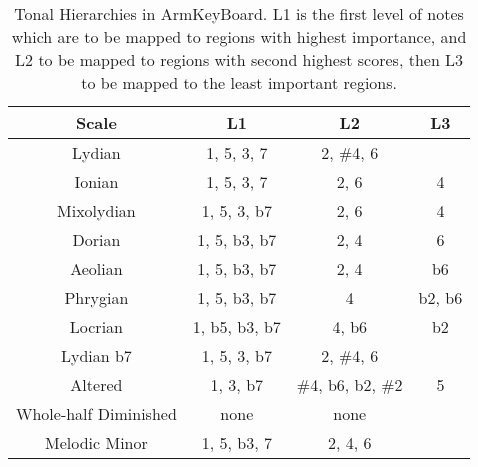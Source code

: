 \begin{table}
\centering
\caption{Tonal Hierarchies in ArmKeyBoard. L1 is the first level of notes which are to be mapped to regions with highest importance, and L2 to be mapped to regions with second highest scores, then L3 to be mapped to the least important regions.}
\begin{tabular}{|c|c|c|c|} \hline
Scale & L1 & L2 & L3\\ \hline
Lydian & 1, 5, 3, 7& 2, \#4, 6 & \\ \hline
Ionian & 1, 5, 3, 7& 2, 6 & 4\\ \hline
Mixolydian & 1, 5, 3, b7 & 2, 6 & 4\\ \hline
Dorian & 1, 5, b3, b7& 2, 4 & 6\\ \hline
Aeolian & 1, 5, b3, b7& 2, 4 & b6\\ \hline
Phrygian & 1, 5, b3, b7& 4 & b2, b6\\ \hline
Locrian & 1, b5, b3, b7& 4, b6 & b2\\ \hline
Lydian b7 & 1, 5, 3, b7& 2, \#4, 6 &\\ \hline
Altered & 1, 3, b7& \#4, b6, b2, \#2 & 5\\ \hline
Whole-half Diminished & none & none &\\ \hline
Melodic Minor & 1, 5, b3, 7& 2, 4, 6 &\\ \hline
\end{tabular}
\label{tab:5-tonalhierarchy}
\end{table}

